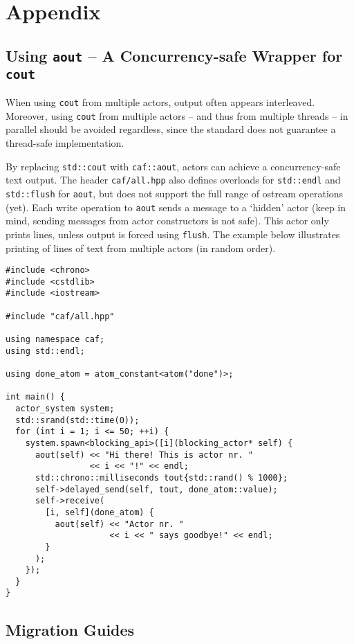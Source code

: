 \section{Appendix}

\subsection{Using \texttt{aout} -- A Concurrency-safe Wrapper for \texttt{cout}}

When using \lstinline^cout^ from multiple actors, output often appears interleaved.
Moreover, using \lstinline^cout^ from multiple actors -- and thus from multiple threads -- in parallel should be avoided regardless, since the standard does not guarantee a thread-safe implementation.

By replacing \texttt{std::cout} with \texttt{caf::aout}, actors can achieve a concurrency-safe text output.
The header \lstinline^caf/all.hpp^ also defines overloads for \texttt{std::endl} and \texttt{std::flush} for \lstinline^aout^, but does not support the full range of ostream operations (yet).
Each write operation to \texttt{aout} sends a message to a `hidden' actor (keep in mind, sending messages from actor constructors is not safe).
This actor only prints lines, unless output is forced using \lstinline^flush^.
The example below illustrates printing of lines of text from multiple actors (in random order).

\begin{lstlisting}
#include <chrono>
#include <cstdlib>
#include <iostream>

#include "caf/all.hpp"

using namespace caf;
using std::endl;

using done_atom = atom_constant<atom("done")>;

int main() {
  actor_system system;
  std::srand(std::time(0));
  for (int i = 1; i <= 50; ++i) {
    system.spawn<blocking_api>([i](blocking_actor* self) {
      aout(self) << "Hi there! This is actor nr. "
                 << i << "!" << endl;
      std::chrono::milliseconds tout{std::rand() % 1000};
      self->delayed_send(self, tout, done_atom::value);
      self->receive(
        [i, self](done_atom) {
          aout(self) << "Actor nr. "
                     << i << " says goodbye!" << endl;
        }
      );
    });
  }
}
\end{lstlisting}

\clearpage
\subsection{Migration Guides}


